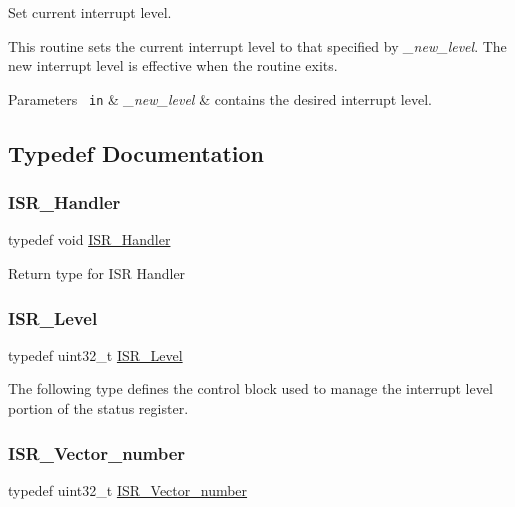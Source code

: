 Set current interrupt level. 

This routine sets the current interrupt level to that specified by {\itshape \+\_\+new\+\_\+level}. The new interrupt level is effective when the routine exits.


\begin{DoxyParams}[1]{Parameters}
\mbox{\texttt{ in}}  & {\em \+\_\+new\+\_\+level} & contains the desired interrupt level. \\
\hline
\end{DoxyParams}


\subsection{Typedef Documentation}
\mbox{\label{group__RTEMSScoreISR_ga49c3b0ab3e84ccac78941b867bf34ccf}} 
\subsubsection{\texorpdfstring{ISR\_Handler}{ISR\_Handler}}
{\footnotesize\ttfamily typedef void \mbox{\hyperlink{group__RTEMSScoreISR_ga49c3b0ab3e84ccac78941b867bf34ccf}{I\+S\+R\+\_\+\+Handler}}}

Return type for I\+SR Handler \mbox{\label{group__RTEMSScoreISR_gad1af728587ebcefec5b5cf94fc7909b9}} 
\subsubsection{\texorpdfstring{ISR\_Level}{ISR\_Level}}
{\footnotesize\ttfamily typedef uint32\+\_\+t \mbox{\hyperlink{group__RTEMSScoreISR_gad1af728587ebcefec5b5cf94fc7909b9}{I\+S\+R\+\_\+\+Level}}}

The following type defines the control block used to manage the interrupt level portion of the status register. \mbox{\label{group__RTEMSScoreISR_gad594e7073b09d33d6b5d1dd2f313fb18}} 
\subsubsection{\texorpdfstring{ISR\_Vector\_number}{ISR\_Vector\_number}}
{\footnotesize\ttfamily typedef uint32\+\_\+t \mbox{\hyperlink{group__RTEMSScoreISR_gad594e7073b09d33d6b5d1dd2f313fb18}{I\+S\+R\+\_\+\+Vector\+\_\+number}}}

